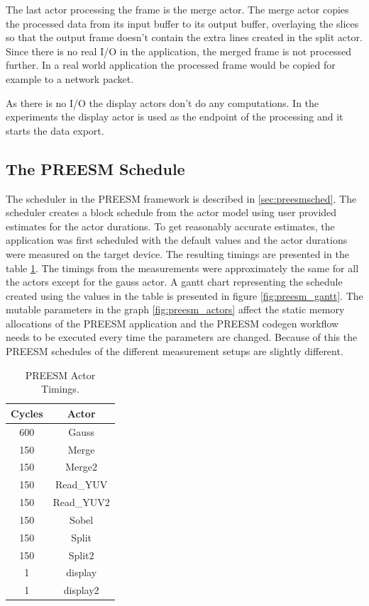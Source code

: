 The last actor processing the frame is the merge actor. The merge actor copies
the processed data from its input buffer to its output buffer, overlaying the
slices so that the output frame doesn't contain the extra lines created in the
split actor. Since there is no real I/O in the application, the merged frame is
not processed further. In a real world application the processed frame would be
copied for example to a network packet.

As there is no I/O the display actors don't do any computations. In the
experiments the display actor is used as the endpoint of the processing and it
starts the data export.

\subsection{The PREESM Schedule}
\label{subsec:preesmsched}

The scheduler in the PREESM framework is described in \ref{sec:preesmsched}.
The scheduler creates a block schedule from the actor model using user provided
estimates for the actor durations. To get reasonably accurate estimates, the
application was first scheduled with the default values and the actor durations
were measured on the target device. The resulting timings are presented in the
table \ref{tab:preesm_times}. The timings from the measurements were approximately
the same for all the actors except for the gauss actor. A gantt
chart representing the schedule created using the values in the table is
presented in figure \ref{fig:preesm_gantt}. The mutable parameters in the graph
\ref{fig:preesm_actors} affect the static memory allocations of the PREESM
application and the PREESM codegen workflow needs to be executed every time the
parameters are changed. Because of this the PREESM schedules of the different
measurement setups are slightly different.

\begin{table}
    \begin{center}
        \begin{tabular}{| c | c |}

            \hline
            Cycles & Actor \\ \hline
            600 & Gauss \\ \hline
            150 & Merge \\ \hline
            150 & Merge2 \\ \hline
            150 & Read\_YUV \\ \hline
            150 & Read\_YUV2 \\ \hline
            150 & Sobel \\ \hline
            150 & Split \\ \hline
            150 & Split2 \\ \hline
            1 & display \\ \hline
            1 & display2 \\ \hline
        \end{tabular}
        \caption{PREESM Actor Timings.}
        \label{tab:preesm_times}
    \end{center}
\end{table}

